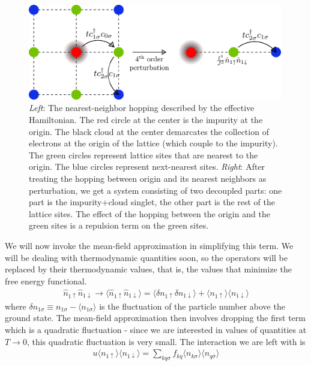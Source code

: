 \documentclass[12pt,twoside]{report}
\numberwithin{equation}{section}
\begin{document}
\begin{figure}[htpb]
	\centering
	\includegraphics[width=0.99\textwidth]{../figures/lattice_eff.png}
	\caption{\textit{Left}: The nearest-neighbor hopping described by the effective Hamiltonian. The red circle at the center is the impurity at the origin. The black cloud at the center demarcates the collection of electrons at the origin of the lattice (which couple to the impurity). The green circles represent lattice sites that are nearest to the origin. The blue circles represent next-nearest sites. \textit{Right}: After treating the hopping between origin and its nearest neighbors as perturbation, we get a system consisting of two decoupled parts: one part is the impurity+cloud singlet, the other part is the rest of the lattice sites. The effect of the hopping between the origin and the green sites is a repulsion term on the green sites.}
\end{figure}
We will now invoke the mean-field approximation in simplifying this term. We will be dealing with thermodynamic quantities soon, so the operators will be replaced by their thermodynamic values, that is, the values that minimize the free energy functional.
\begin{equation}\begin{aligned}
	\hat n_{1 \uparrow} \hat n_{1 \downarrow} \to \langle\hat n_{1 \uparrow} \hat n_{1 \downarrow}\rangle = \langle \delta n_{1 \uparrow} \delta n_{1 \downarrow}\rangle + \langle n_{1 \uparrow}\rangle\langle n_{1 \downarrow}\rangle
\end{aligned}\end{equation}
where \(\delta n_{1\sigma} \equiv n_{1 \sigma} - \langle n_{1\sigma} \rangle\) is the fluctuation of the particle number above the ground state. The mean-field approximation then involves dropping the first term which is a quadratic fluctuation - since we are interested in values of quantities at \( T \to 0\), this quadratic fluctuation is very small. The interaction we are left with is 
\begin{equation}\begin{aligned}
	u\langle n_{1 \uparrow}\rangle\langle n_{1 \downarrow}\rangle = \sum_{kq\sigma}f_{kq}\langle n_{k \sigma}\rangle\langle n_{q \overline\sigma}\rangle
\end{aligned}\end{equation}
\end{document}
